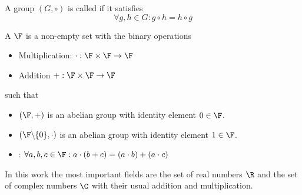 \begin{defn}
	A group $(G, \circ)$ is called  if it satisfies
	\[ \forall g, h \in G: g \circ h = h \circ g \]
\end{defn}

\begin{defn}
	\label{defn:Field}
	A  $\F$ is a non-empty set with the binary operations
	\begin{itemize}
		\item Multiplication: $\cdot: \F \times \F \to \F$
		\item Addition $+: \F \times \F \to \F$
	\end{itemize}
	such that
	\begin{itemize}
		\item $(\F, +)$ is an abelian group with identity element $0 \in \F$.
		\item $\left( \F \backslash \{ 0 \}, \cdot \right)$ is an abelian group
			with identity element $1 \in \F$.
		\item {}: $\forall a,b,c \in \F: a \cdot (b + c) = (a \cdot b) + (a \cdot c)$
	\end{itemize}
\end{defn}

\begin{exmp}
	In this work the most important fields are the set of real numbers $\R$
	and the set of complex numbers $\C$ with their usual addition and multiplication.
\end{exmp}

